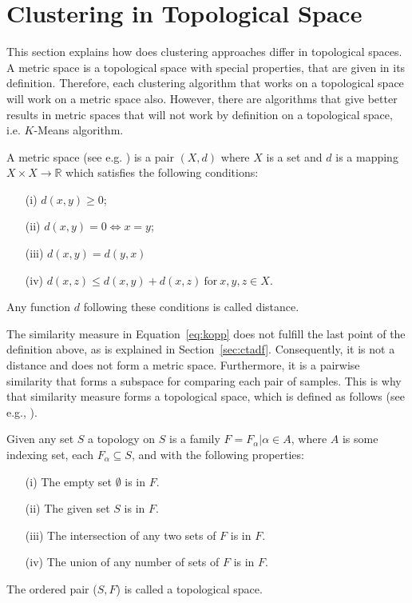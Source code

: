 \documentclass[thesis=B,english]{FITthesis}[2012/10/20]
\begin{document}
\section{Clustering in Topological Space}\label{sec:cluster_topo}
This section explains how does clustering approaches differ in topological spaces.
A metric space is a topological space with special properties, that are given in its definition.
Therefore, each clustering algorithm that works on a topological space will work on a metric space also.
However, there are algorithms that give better results in metric spaces that will not work by definition on a topological space, i.e. $K$-Means algorithm.

A metric space (see e.g. \cite{choudhary1992elements}) is a pair $(X, d)$ where $X$ is a set and $d$ is a mapping $X \times X \to \mathbb{R}$ which satisfies the following conditions:
\begin{enumerate}
    \item [(i)] $d(x, y) \geq 0$;
    \item [(ii)] $d(x, y) = 0 \iff x = y$;
    \item [(iii)] $d(x, y) = d(y, x)$
    \item [(iv)] $d(x, z) \leq d(x, y) + d(x, z) \  \mathrm{for} \  x, y, z \in X$.
\end{enumerate}
Any function $d$ following these conditions is called distance. 

The similarity measure in Equation~\ref{eq:kopp} does not fulfill the last point of the definition above, as is explained in Section~\ref{sec:ctadf}.
Consequently, it is not a distance and does not form a metric space. Furthermore, it is a pairwise similarity that forms a subspace for comparing each pair of samples.
This is why that similarity measure forms a topological space, which is defined as follows (see e.g., \cite{stahl2014introduction}).

Given any set $S$ a topology on $S$ is a family $F ={F_{\alpha} | \alpha \in A}$, where $A$ is some indexing set, each $F_{\alpha}  \subseteq S$, and with the following properties:
\begin{enumerate}
    \item [(i)] The empty set $\emptyset$ is in $F$.
    \item [(ii)] The given set $S$ is in $F$.
    \item [(iii)] The intersection of any two sets of $F$ is in $F$.
    \item [(iv)] The union of any number of sets of $F$ is in $F$.
\end{enumerate}
The ordered pair ($S, F$) is called a topological space.
\end{document}
